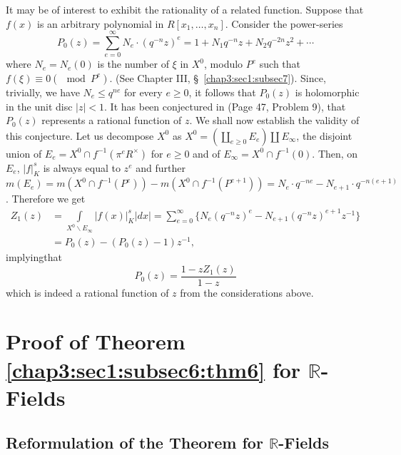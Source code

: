 It may be of interest to exhibit the rationality of a related
function. Suppose that $f(x)$ is an arbitrary polynomial in
$R[x_{1},\ldots,x_{n}]$. Consider the power-series
$$
P_{0}(z)=\sum\limits^{\infty}_{e=0}N_{e}\cdot
(q^{-n}z)^{e}=1+N_{1}q^{-n}z+N_{2}q^{-2n}z^{2}+\cdots
$$
where $N_{e}=N_{e}(0)$ is the number of $\xi$ in $X^{0}$, modulo
$P^{e}$ such that $f(\xi)\equiv 0(\mod P^{e})$. (See Chapter III,
\S\ \ref{chap3:sec1:subsec7}). Since, trivially, we have $N_{e}\leq q^{ne}$ for every
$e\geq 0$, it follows that $P_{0}(z)$ is holomorphic in the unit disc
$|z|<1$. It has been conjectured in \cite{Bor-Sha} (Page 47, Problem 9),
that $P_{0}(z)$ represents a rational function of $z$. We shall now
establish the validity of this conjecture. Let us decompose $X^{0}$ as
$X^{0}=\left(\coprod\limits_{e\geq 0}E_{e}\right)\coprod E_{\infty}$,
the disjoint union of $E_{e}=X^{0}\cap f^{-1}(\pi^{e}R^{\times})$ for
$e\geq 0$ and of $E_{\infty}=X^{0}\cap f^{-1}(0)$. Then, on $E_{e}$,
$|f|^{s}_{K}$ is always equal to $z^{e}$ and further
$m(E_{e})=m(X^{0}\cap f^{-1}(P^{e}))-m(X^{0}\cap
f^{-1}(P^{e+1}))=N_{e}\cdot q^{-ne}-N_{e+1}\cdot
q^{-n(e+1)}$. Therefore we get
\begin{align*}
  Z_{1}(z) &= \int\limits_{X^{0}\backslash
    E_{\infty}}|f(x)|^{s}_{K}|dx|=\sum\limits^{\infty}_{e=0}
  \{N_{e}(q^{-n}z)^{e}-N_{e+1}(q^{-n}z)^{e+1}z^{-1}\}\\
  &= P_{0}(z)-(P_{0}(z)-1)z^{-1}, 
\end{align*}
implying\pageoriginale that
$$
P_{0}(z)=\frac{1-zZ_{1}(z)}{1-z}
$$
which is indeed a rational function of $z$ from the considerations
above.

\section{Proof of Theorem \ref{chap3:sec1:subsec6:thm6} for
  $\mathbb{R}$-Fields}\label{chap3:sec4}  %

\subsection{Reformulation of the Theorem for
  $\mathbb{R}$-Fields}\label{chap3:sec4:subsec1}%

